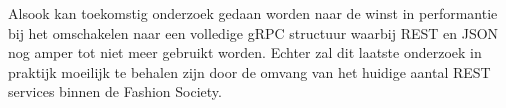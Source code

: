 \documentclass[a0,portrait]{a0poster}
\begin{document}
\begin{multicols}{2}
Alsook kan toekomstig onderzoek gedaan worden naar de winst in performantie bij het omschakelen naar een volledige gRPC structuur waarbij REST en JSON nog amper tot niet meer gebruikt worden. Echter zal dit laatste onderzoek in praktijk moeilijk te behalen zijn door de omvang van het huidige aantal REST services binnen de Fashion Society.



\end{multicols}
\end{document}
